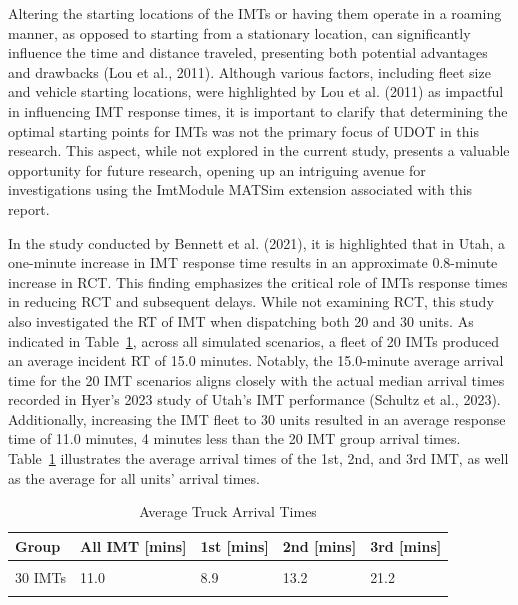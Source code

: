 \documentclass[fancy, oneside, mastersfancy, ms]{byuthesis}
\begin{document}
Altering the starting locations of the IMTs or having them operate in a
roaming manner, as opposed to starting from a stationary location, can
significantly influence the time and distance traveled, presenting both
potential advantages and drawbacks (Lou et al., 2011). Although various
factors, including fleet size and vehicle starting locations, were
highlighted by Lou et al. (2011) as impactful in influencing IMT
response times, it is important to clarify that determining the optimal
starting points for IMTs was not the primary focus of UDOT in this
research. This aspect, while not explored in the current study, presents
a valuable opportunity for future research, opening up an intriguing
avenue for investigations using the ImtModule MATSim extension
associated with this report.

In the study conducted by Bennett et al. (2021), it is highlighted that
in Utah, a one-minute increase in IMT response time results in an
approximate 0.8-minute increase in RCT. This finding emphasizes the
critical role of IMTs response times in reducing RCT and subsequent
delays. While not examining RCT, this study also investigated the RT of
IMT when dispatching both 20 and 30 units. As indicated in
Table~\ref{tbl-truck-arrival-table}, across all simulated scenarios, a
fleet of 20 IMTs produced an average incident RT of 15.0 minutes.
Notably, the 15.0-minute average arrival time for the 20 IMT scenarios
aligns closely with the actual median arrival times recorded in Hyer's
2023 study of Utah's IMT performance (Schultz et al., 2023).
Additionally, increasing the IMT fleet to 30 units resulted in an
average response time of 11.0 minutes, 4 minutes less than the 20 IMT
group arrival times. Table~\ref{tbl-truck-arrival-table} illustrates the
average arrival times of the 1st, 2nd, and 3rd IMT, as well as the
average for all units' arrival times.

\hypertarget{tbl-truck-arrival-table}{}
\begin{table}
\caption{\label{tbl-truck-arrival-table}Average Truck Arrival Times }\tabularnewline

\centering
\begin{tabular}[t]{lllll}
\toprule
\textbf{Group} & \textbf{All IMT [mins]} & \textbf{1st [mins]} & \textbf{2nd [mins]} & \textbf{3rd [mins]}\\
\midrule
\cellcolor{gray!6}{20 IMTs} & \cellcolor{gray!6}{15.0} & \cellcolor{gray!6}{11.1} & \cellcolor{gray!6}{21.1} & \cellcolor{gray!6}{28.9}\\
30 IMTs & 11.0 & 8.9 & 13.2 & 21.2\\
\cellcolor{gray65}{\cellcolor{gray!6}{Number of Incidents}} & \cellcolor{gray65}{\cellcolor{gray!6}{280}} & \cellcolor{gray65}{\cellcolor{gray!6}{280}} & \cellcolor{gray65}{\cellcolor{gray!6}{116}} & \cellcolor{gray65}{\cellcolor{gray!6}{23}}\\
\bottomrule
\end{tabular}
\end{table}
\end{document}
